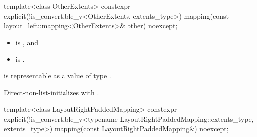 %
\begin{itemdecl}
template<class OtherExtents>
  constexpr explicit(!is_convertible_v<OtherExtents, extents_type>)
    mapping(const layout_left::mapping<OtherExtents>& other) noexcept;
\end{itemdecl}

\begin{itemdescr}
\pnum
\constraints
\begin{itemize}
\item
{} is , and
\item
{} is .
\end{itemize}

\pnum
\expects
{} is representable as
a value of type .

\pnum
\effects
Direct-non-list-initializes  with .
\end{itemdescr}

%
\begin{itemdecl}
template<class LayoutRightPaddedMapping>
  constexpr explicit(!is_convertible_v<typename LayoutRightPaddedMapping::extents_type,
                                       extents_type>)
    mapping(const LayoutRightPaddedMapping&) noexcept;
\end{itemdecl}


